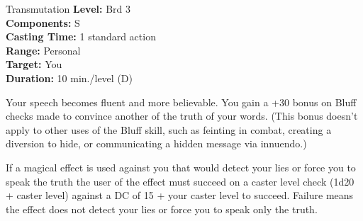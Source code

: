 {Transmutation}
{
	\textbf{Level:}
	Brd 3\\
	\textbf{Components:}
	S\\
	\textbf{Casting Time:}
	1 standard action\\
	\textbf{Range:}
	Personal\\
	\textbf{Target:}
	You\\
	\textbf{Duration:}
	10 min./level (D)\\
}
{
	Your speech becomes fluent and more believable. You gain a +30 bonus on Bluff checks made to convince another of the truth of your words. (This bonus doesn't apply to other uses of the Bluff skill, such as feinting in combat, creating a diversion to hide, or communicating a hidden message via innuendo.)

	If a magical effect is used against you that would detect your lies or force you to speak the truth the user of the effect must succeed on a caster level check (1d20 + caster level) against a DC of 15 + your caster level to succeed. Failure means the effect does not detect your lies or force you to speak only the truth.

}
